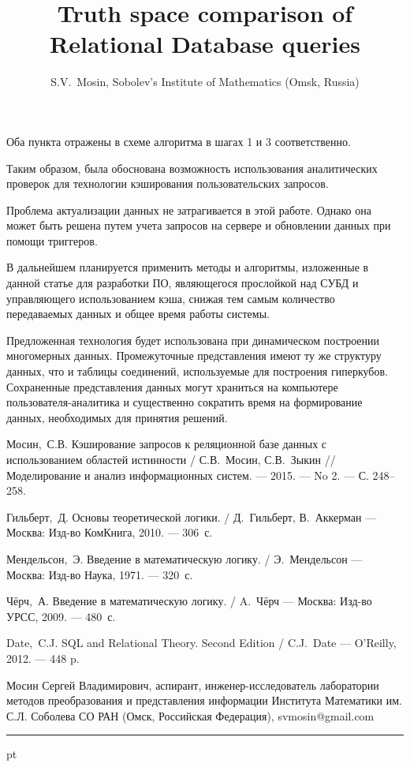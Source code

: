 \documentclass{cmi}
\begin{document}
Оба пункта отражены в схеме алгоритма в шагах 1 и 3 соответственно.

Таким образом, была обоснована возможность использования аналитических проверок для технологии кэширования пользовательских запросов.

Проблема актуализации данных не затрагивается в этой работе. Однако она может быть решена
путем учета запросов на сервере и обновлении данных при помощи триггеров.

В дальнейшем планируется применить методы и алгоритмы, изложенные в данной статье для разработки ПО, являющегося прослойкой над СУБД и управляющего использованием кэша, снижая тем самым количество передаваемых данных и общее время работы системы.

Предложенная технология будет использована при динамическом построении многомерных данных.
Промежуточные представления имеют ту же структуру данных, что и таблицы соединений, используемые для
построения гиперкубов. Сохраненные представления данных могут храниться на компьютере пользователя-аналитика и существенно сократить время на формирование данных, необходимых для принятия решений.


\begin{biblio}
Мосин,~С.В. Кэширование запросов к реляционной базе данных с
использованием областей истинности / С.В.~Мосин, С.В.~Зыкин //
Моделирование и анализ информационных систем. --- 2015. --- No 2. --- С. 248--258.

Гильберт,~Д. Основы теоретической логики. /
Д.~Гильберт, В.~Аккерман --- Москва: Изд-во КомКнига, 2010. --- 306~с.

Мендельсон,~Э. Введение в математическую логику. /
Э.~Мендельсон --- Москва: Изд-во Наука, 1971. --- 320~с.


Чёрч,~А. Введение в математическую логику. /
A.~Чёрч --- Москва: Изд-во УРСС, 2009. --- 480~с.

Date,~C.J. SQL and Relational Theory. Second Edition / C.J.~Date --- O'Reilly, 2012. --- 448 p.
\end{biblio}


{Мосин Сергей Владимирович,
аспирант,
инженер-исследователь лаборатории методов преобразования и представления информации Института Математики им. С.Л. Соболева СО РАН (Омск, Российская Федерация),
svmosin@gmail.com}

{\phantom{eee} \hrule {} pt}
\classify{} %
\author{S.V.~Mosin, {\rm  Sobolev's Institute of Mathematics (Omsk, Russia)}}
\title{Truth space comparison of Relational Database queries}
\maketitle{}
\end{document}
